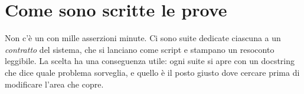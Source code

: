 \section{Come sono scritte le prove}\label{sez:prove}

Non c'è un  con mille asserzioni minute. Ci sono suite
dedicate ciascuna a un \emph{contratto} del sistema, che si lanciano come
script e stampano un resoconto leggibile. La scelta ha una conseguenza utile:
ogni suite si apre con un docstring che dice quale problema sorveglia, e
quello è il posto giusto dove cercare prima di modificare l'area che copre.

